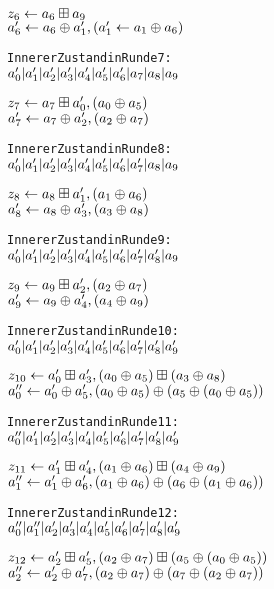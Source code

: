 \documentclass[a4paper,12pt]{article}
\begin{document}
\begin{appendix}
\begin{alltt}
\( z\sb{6} \leftarrow a\sb{6} \boxplus a\sb{9}\)
\( a'\sb{6} \leftarrow a\sb{6} \oplus a'\sb{1} , (a'\sb{1} \leftarrow a\sb{1} \oplus a\sb{6}) \) 

Innerer Zustand in Runde 7:
\( a'\sb{0} | a'\sb{1} | a'\sb{2} | a'\sb{3} | a'\sb{4} | a'\sb{5} | a'\sb{6} | a\sb{7} | a\sb{8} | a\sb{9} \)

\( z\sb{7} \leftarrow a\sb{7} \boxplus a'\sb{0} , (a\sb{0} \oplus a\sb{5}) \)
\( a'\sb{7} \leftarrow a\sb{7} \oplus a'\sb{2} , (a\sb{2} \oplus a\sb{7}) \) 

Innerer Zustand in Runde 8:
\( a'\sb{0} | a'\sb{1} | a'\sb{2} | a'\sb{3} | a'\sb{4} | a'\sb{5} | a'\sb{6} | a'\sb{7} | a\sb{8} | a\sb{9} \)

\( z\sb{8} \leftarrow a\sb{8} \boxplus a'\sb{1} , (a\sb{1} \oplus a\sb{6}) \)
\( a'\sb{8} \leftarrow a\sb{8} \oplus a'\sb{3} , (a\sb{3} \oplus a\sb{8}) \) 

Innerer Zustand in Runde 9:
\( a'\sb{0} | a'\sb{1} | a'\sb{2} | a'\sb{3} | a'\sb{4} | a'\sb{5} | a'\sb{6} | a'\sb{7} | a'\sb{8} | a\sb{9} \)

\( z\sb{9} \leftarrow a\sb{9} \boxplus a'\sb{2} , (a\sb{2} \oplus a\sb{7}) \)
\( a'\sb{9} \leftarrow a\sb{9} \oplus a'\sb{4} , (a\sb{4} \oplus a\sb{9}) \) 

Innerer Zustand in Runde 10:
\( a'\sb{0} | a'\sb{1} | a'\sb{2} | a'\sb{3} | a'\sb{4} | a'\sb{5} | a'\sb{6} | a'\sb{7} | a'\sb{8} | a'\sb{9} \)

\( z\sb{10} \leftarrow a'\sb{0} \boxplus a'\sb{3} , (a\sb{0} \oplus a\sb{5}) \boxplus (a\sb{3} \oplus a\sb{8}) \)
\( a''\sb{0} \leftarrow a'\sb{0} \oplus a'\sb{5} , (a\sb{0} \oplus a\sb{5}) \oplus (a\sb{5} \oplus (a\sb{0} \oplus a\sb{5})) \) 

Innerer Zustand in Runde 11:
\( a''\sb{0} | a'\sb{1} | a'\sb{2} | a'\sb{3} | a'\sb{4} | a'\sb{5} | a'\sb{6} | a'\sb{7} | a'\sb{8} | a'\sb{9} \)

\( z\sb{11} \leftarrow a'\sb{1} \boxplus a'\sb{4} , (a\sb{1} \oplus a\sb{6}) \boxplus (a\sb{4} \oplus a\sb{9}) \)
\( a''\sb{1} \leftarrow a'\sb{1} \oplus a'\sb{6} , (a\sb{1} \oplus a\sb{6}) \oplus (a\sb{6} \oplus (a\sb{1} \oplus a\sb{6})) \) 

Innerer Zustand in Runde 12:
\( a''\sb{0} | a''\sb{1} | a'\sb{2} | a'\sb{3} | a'\sb{4} | a'\sb{5} | a'\sb{6} | a'\sb{7} | a'\sb{8} | a'\sb{9} \)

\( z\sb{12} \leftarrow a'\sb{2} \boxplus a'\sb{5} , (a\sb{2} \oplus a\sb{7}) \boxplus (a\sb{5} \oplus (a\sb{0} \oplus a\sb{5})) \)
\( a''\sb{2} \leftarrow a'\sb{2} \oplus a'\sb{7} , (a\sb{2} \oplus a\sb{7}) \oplus (a\sb{7} \oplus (a\sb{2} \oplus a\sb{7})) \) 


\end{alltt}
\end{appendix}
\end{document}
